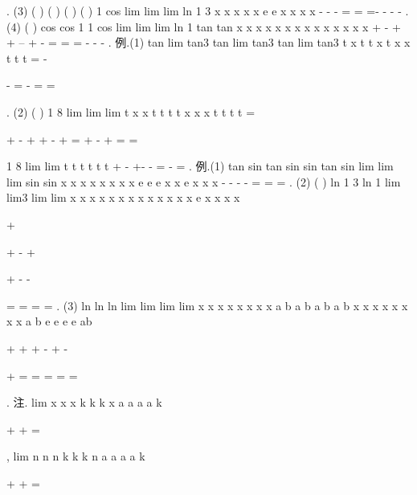 . 
(3)
(
)
(
)
(
)
(
)
1 cos
lim
lim
lim
ln 1 3
x
x
x
x
x
e
e
x
x
x
x
\to 
\to 
\to 
-
-
-
=
=
=-
-
-
-
. 
(4)
(
)
cos
cos
1 1
cos
lim
lim
lim
ln 1
tan
tan
x
x
x
x
x
x
x
x
x
x
x
x
x
x
\to 
\to 
\to 
+
-
+
+
--
+
-
=
=
=
-
-
-
. 
\textcolor{lyred}{例}.(1)
tan
lim tan3 tan
lim tan3
tan
lim
tan3
t
x
t
t
x
t
x
x
t
t
t
\pi 
\pi 
\pi 
\pi 
=
-
\to 
\to 
\to 




-
=
-
=
=








. 
(2)
(
)
1 8
lim
lim
lim
t
x
x
t
t
t
t
x
x
x
t
t
t
t
=
\to \infty 
\to 
\to 


+
-
+
+
-
+
=
+
-
+
=
=






1 8
lim
lim
t
t
t
t
t
t
\to 
\to 
+
-
+-
-
=
-
=
. 
\textcolor{lyred}{例}.(1)
tan
sin
tan
sin
sin
tan
sin
lim
lim
lim
sin
sin
x
x
x
x
x
x
x
x
e
e
e
x
x
e
x
x
x
-
\to 
\to 
\to 
-
-
-
=
\cdots 
=
=
. 
(2)
(
)
ln 1 3
ln 1
lim
lim3
lim
lim
x
x
x
x
x
x
x
x
x
x
x
x
x
e
x
x
x
x


+




\to 
\to 
\to 
\to 




+
-
+




+
-
-




=
=
=
=
. 
(3)
ln
ln
ln
lim
lim
lim
lim
x
x
x
x
x
x
x
x
a
b
a
b
a
b
a
b
x
x
x
x
x
x
x
x
a
b
e
e
e
e
ab
\to 
\to 




+
+
+
-
+
-












\to 
\to 


+
=
=
=
=
=




. 
\textcolor{lyred}{注}.
lim
x
x
x
k
k
k
x
a
a
a
a
k
\to 


+
+
=




\Lambda 
\Lambda 
,
lim
n
n
n
k
k
k
n
a
a
a
a
k
\to \infty 


+
+
=






